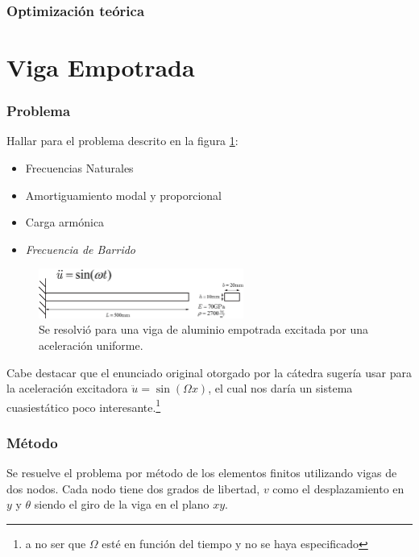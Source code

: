\documentclass[onecolumn,10pt,titlepage,a4paper]{article}
\begin{document}
\section{Optimización teórica}


\clearpage
\part{Viga Empotrada}

\setcounter{section}{0}
\section{Problema}
Hallar para el problema descrito en la figura \ref{fig:enunciado}:
\begin{itemize}
	\item Frecuencias Naturales
	\item Amortiguamiento modal y proporcional
	\item Carga armónica
	\item \textit{Frecuencia de Barrido}
\end{itemize}

\begin{figure}[htb!]
	\centering
	\includegraphics[width=0.6\textwidth]{fig/enunciado.eps}
	\caption{Se resolvió para una viga de aluminio empotrada excitada por una aceleración uniforme.}\label{fig:enunciado}
\end{figure}
Cabe destacar que el enunciado original otorgado por la cátedra sugería usar para la aceleración excitadora $\ddot{u}=\sin (\Omega x)$, el cual nos daría un sistema cuasiestático poco interesante.\footnote{a no ser que $\Omega$ esté en función del tiempo y no se haya especificado}

\section{Método}
Se resuelve el problema por método de los elementos finitos utilizando vigas de dos nodos. Cada nodo tiene dos grados de libertad, $v$ como el desplazamiento en $y$ y $\theta$ siendo el giro de la viga en el plano $x\!y$.
\end{document}
